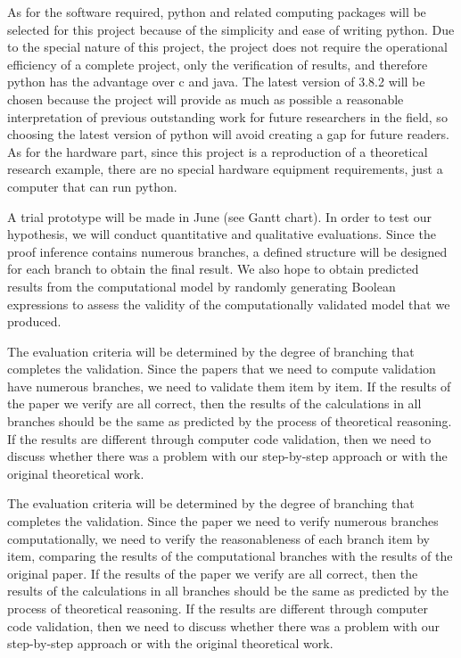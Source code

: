 \documentclass{sigchi}
\begin{document}
As for the software required, python and related computing packages will be selected for this project because of the simplicity and ease of writing python. Due to the special nature of this project, the project does not require the operational efficiency of a complete project, only the verification of results, and therefore python has the advantage over c and java. The latest version of 3.8.2 will be chosen because the project will provide as much as possible a reasonable interpretation of previous outstanding work for future researchers in the field, so choosing the latest version of python will avoid creating a gap for future readers. As for the hardware part, since this project is a reproduction of a theoretical research example, there are no special hardware equipment requirements, just a computer that can run python.

A trial prototype will be made in June (see Gantt chart). In order to test our hypothesis, we will conduct quantitative and qualitative evaluations. Since the proof inference contains numerous branches, a defined structure will be designed for each branch to obtain the final result. We also hope to obtain predicted results from the computational model by randomly generating Boolean expressions to assess the validity of the computationally validated model that we produced.

The evaluation criteria will be determined by the degree of branching that completes the validation. Since the papers that we need to compute validation have numerous branches, we need to validate them item by item. If the results of the paper we verify are all correct, then the results of the calculations in all branches should be the same as predicted by the process of theoretical reasoning. If the results are different through computer code validation, then we need to discuss whether there was a problem with our step-by-step approach or with the original theoretical work.

The evaluation criteria will be determined by the degree of branching that completes the validation. Since the paper we need to verify numerous branches computationally, we need to verify the reasonableness of each branch item by item, comparing the results of the computational branches with the results of the original paper. If the results of the paper we verify are all correct, then the results of the calculations in all branches should be the same as predicted by the process of theoretical reasoning. If the results are different through computer code validation, then we need to discuss whether there was a problem with our step-by-step approach or with the original theoretical work.
\end{document}
